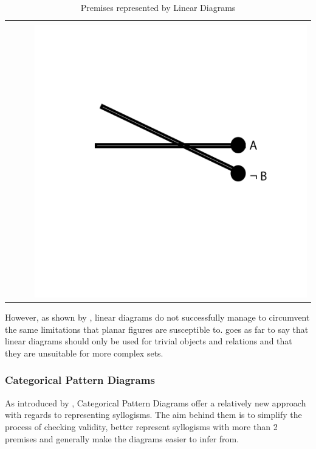\documentclass[12pt,a4paper]{report}
\begin{document}
\begin{table}[h!]
\begin{tabular}{  c  c  c  c }
\begin{minipage}{.22\textwidth}
    \end{minipage}
    \\
    &
     &
     &
    \begin{minipage}{.22\textwidth}
      \includegraphics[width=\textwidth]{O2Linear}
    \end{minipage}
    \\
  \end{tabular}
  \caption{Premises represented by Linear Diagrams}\label{tbl:linearPremises}
\end{table}
\FloatBarrier

However, as shown by \cite{lemon1998insufficiency}, linear diagrams do not successfully manage to circumvent the same limitations that planar figures are susceptible to. \cite{lemon1998insufficiency} goes as far to say that linear diagrams should only be used for trivial objects and relations and that they are unsuitable for more complex sets.

\subsubsection{Categorical Pattern Diagrams}
As introduced by \cite{cheng2012visualizing}, Categorical Pattern Diagrams offer a relatively new approach with regards to representing syllogisms. The aim behind them is to simplify the process of checking validity, better represent syllogisms with more than 2 premises and generally make the diagrams easier to infer from.
\end{document}
